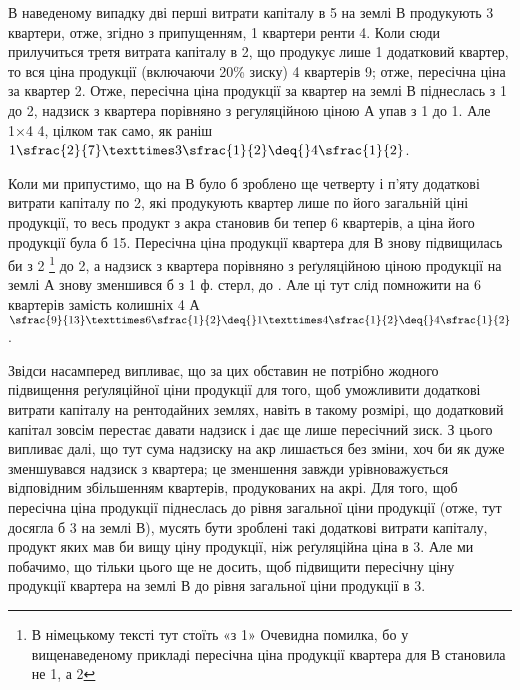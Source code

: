 В наведеному випадку дві перші витрати капіталу в 5 на землі $В$
продукують 3 квартери, отже, згідно з припущенням, 1
квартери ренти \deq{} 4. Коли сюди прилучиться третя витрата
капіталу в 2,
що продукує лише 1 додатковий квартер, то вся ціна продукції (включаючи 20\%
зиску) 4 квартерів \deq{} 9; отже, пересічна ціна за
квартер \deq{} 2. Отже, пересічна ціна продукції за квартер на землі $В$
піднеслась з 1
до 2, надзиск з квартера порівняно з регуляційною ціною $А$ упав
з 1 до 1. Але 1×4 \deq{} 4, цілком так само,
як раніш $1\sfrac{2}{7} × 3\sfrac{1}{2} \deq{} 4\sfrac{1}{2}$.

Коли ми припустимо, що на $В$ було б зроблено ще четверту і п’яту додаткові
витрати капіталу по 2, які продукують квартер лише по його
загальній ціні продукції, то весь продукт з акра становив би тепер 6 квартерів,
а ціна його продукції була б 15. Пересічна ціна продукції
квартера для $В$ знову підвищилась би з 2
\footnote*{В німецькому тексті тут стоїть «з 1» Очевидна помилка,
бо у вищенаведеному прикладі пересічна ціна продукції квартера для $В$
становила не 1, а 2 }
до 2, а надзиск з квартера
порівняно з реґуляційною ціною продукції на землі $А$ знову зменшився
б з 1 ф. стерл, до . Але ці  тут слід
помножити на 6 квартерів замість колишніх 4
$А$ $\sfrac{9}{13}×6\sfrac{1}{2} \deq{} 1× 4\sfrac{1}{2} \deq{} 4\sfrac{1}{2}$.

Звідси насамперед випливає, що за цих обставин не потрібно жодного підвищення
реґуляційної ціни продукції для того, щоб уможливити додаткові витрати
капіталу на рентодайних землях, навіть в такому розмірі, що додатковий
капітал зовсім перестає давати надзиск і дає ще лише пересічний зиск. З
цього випливає далі, що тут сума надзиску на акр лишається без зміни,
хоч би як дуже зменшувався надзиск з квартера; це зменшення завжди урівноважується
відповідним збільшенням квартерів, продукованих на акрі. Для того,
щоб пересічна ціна продукції піднеслась до рівня загальної ціни продукції (отже,
тут досягла б 3 на землі $В$), мусять бути зроблені такі додаткові витрати
капіталу, продукт яких мав би вищу ціну продукції, ніж реґуляційна ціна
в 3. Але ми побачимо, що тільки цього ще не досить, щоб підвищити
пересічну ціну продукції квартера на землі $В$ до рівня загальної ціни продукції
в 3.

